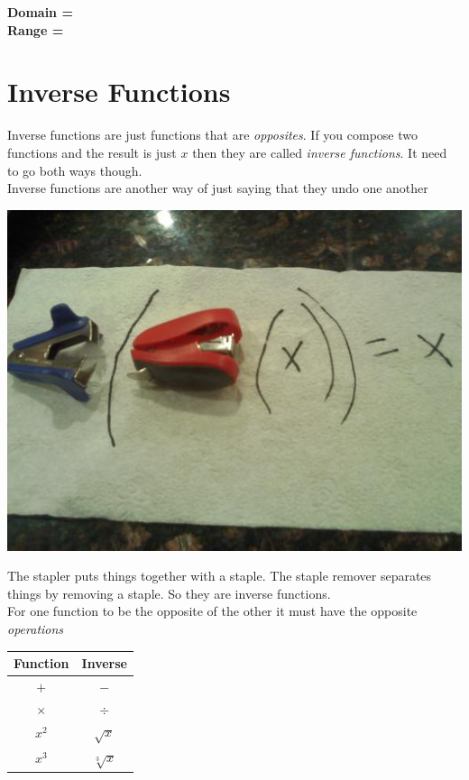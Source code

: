 \documentclass[12pt]{article}
\let\stdsection\section
\renewcommand\section{\newpage\stdsection}
\begin{document}
\vspace{1.5cm}

\textbf{Domain =}\\

\textbf{Range =}



\section{Inverse Functions}

Inverse functions are just functions that are \textit{opposites}. If you compose two functions and the result is just $x$ then they are called \textit{inverse functions}. It need to go both ways though.\\

Inverse functions are another way of just saying that they undo one another\\

\begin{center}
\includegraphics[scale=.4]{stapler.jpg}
\end{center}

The stapler puts things together with a staple. The staple remover separates things by removing a staple. So they are inverse functions.\\

For one function to be the opposite of the other it must have the opposite \textit{operations}\\

\begin{center}
\begin{tabular}{ c | c }

Function & Inverse \\ \hline

$+$ & $-$\\

$\times$ & $\div$ \\

$x^2$ & $\sqrt{x}$ \\

$x^3$ & $\sqrt[3]{x}$\\

\end{tabular}
\end{center}
\end{document}
